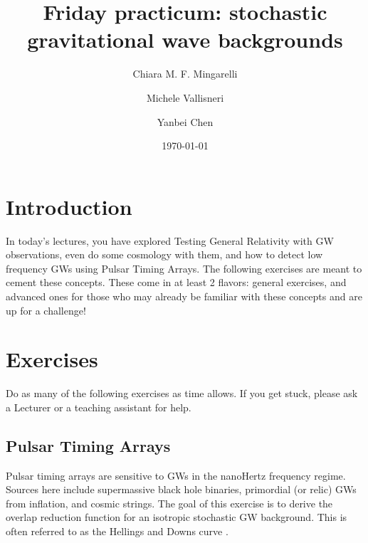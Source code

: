 \documentclass[article, onecolumn, ,nofootinbib,nopreprintnumbers]{revtex4}
\begin{document}
\title{Friday practicum: stochastic gravitational wave backgrounds}
\author{Chiara M. F. Mingarelli}
\author{Michele Vallisneri}
\author{Yanbei Chen}

\date\today
\maketitle

\section{Introduction}
In today's lectures, you have explored Testing General Relativity with GW observations, even do some cosmology with them, and how to detect low frequency GWs using Pulsar Timing Arrays. The following exercises are meant to cement these concepts. These come in at least 2 flavors: general exercises, and advanced ones for those who may already be familiar with these concepts and are up for a challenge! 

\section{Exercises}
Do as many of the following exercises as time allows. If you get stuck, please ask a Lecturer or a teaching assistant for help.

\subsection{Pulsar Timing Arrays}
Pulsar timing arrays are sensitive to GWs in the nanoHertz frequency regime. Sources here include supermassive black hole binaries, primordial (or relic) GWs from inflation, and cosmic strings. The goal of this exercise is to derive the overlap reduction function for an isotropic stochastic GW background. This is often referred to as the Hellings and Downs curve \cite{HellingsDowns:1983}.
\end{document}
